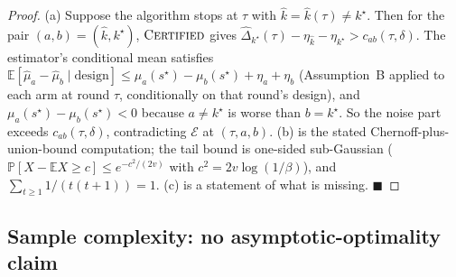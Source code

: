\begin{proof}
(a) Suppose the algorithm stops at $\tau$ with $\hat{k} = \hat{k}(\tau) \ne k^\star$. Then for the
pair $(a,b) = (\hat{k}, k^\star)$, $\textsc{Certified}$ gives $\widehat\Delta_{k^\star}(\tau) -
\eta_{\hat{k}} - \eta_{k^\star} > c_{ab}(\tau,\delta)$. The estimator's conditional mean satisfies
$\mathbb{E}[\hat\mu_a - \hat\mu_b \mid \text{design}] \le \mu_a(s^\star) - \mu_b(s^\star) + \eta_a
+ \eta_b$ (Assumption~B applied to each arm at round $\tau$, conditionally on that round's
design), and
$\mu_a(s^\star) - \mu_b(s^\star) < 0$ because $a \ne k^\star$ is worse than $b = k^\star$. So the
noise part exceeds $c_{ab}(\tau,\delta)$, contradicting $\mathcal{E}$ at $(\tau, a, b)$. (b) is the
stated Chernoff-plus-union-bound computation; the tail bound is one-sided sub-Gaussian
($\mathbb{P}[X - \mathbb{E}X \ge c] \le e^{-c^2/(2 v)}$ with $c^2 = 2v\log(1/\beta)$), and
$\sum_{t\ge1} 1/(t(t+1)) = 1$. (c) is a statement of what is missing. $\blacksquare$
\end{proof}

\subsection{Sample complexity: no asymptotic-optimality claim}
\label{sec:theorem4-optimality}

